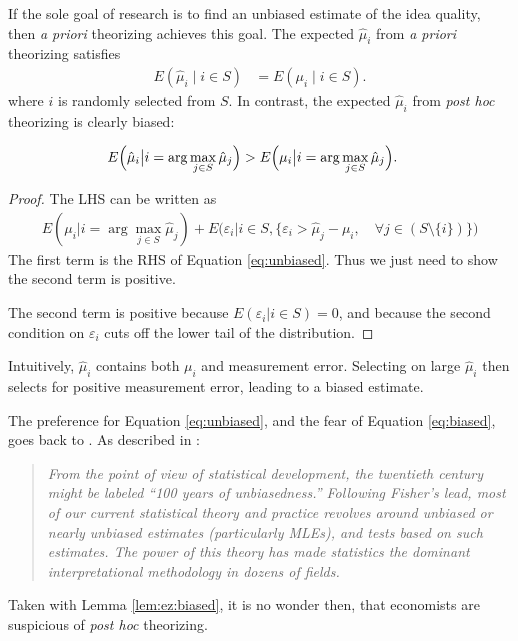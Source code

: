 \documentclass[12pt,english]{article}
\theoremstyle{plain}
\theoremstyle{plain}
\begin{document}
If the sole goal of research is to find an unbiased estimate of the idea quality, then \emph{a priori} theorizing achieves this goal.  The expected $\hat{\mu}_{i}$ from \emph{a priori} theorizing satisfies
\begin{align}
E\left(\hat{\mu}_{i}\mid i\in S \right) &= E\left(\mu_{i}\mid i\in S \right).
\label{eq:unbiased}
\end{align}
where $i$ is randomly selected from $S$. In contrast, the expected $\hat{\mu}_{i}$ from \emph{post hoc} theorizing is clearly biased:
\begin{lemma}\label{lem:ez:biased}
    \begin{align}
        E\Bigl(\hat{\mu}_{i}\big|i=\arg\max_{j\in S }\hat{\mu}_{j}\Bigr) & >E\Bigl(\mu_{i}\big|i=\arg\max_{j\in S }\hat{\mu}_{j}\Bigr).
        \label{eq:biased}
    \end{align}            
\end{lemma}
\begin{proof}
    The LHS can be written as 
    \begin{align*}
        E\left(\mu_i \big| i = \arg\max_{j \in S} \hat{\mu}_j\right) 
        +
        E\bigg(\varepsilon_i
        \big|
        i \in S,
        \{
         \varepsilon_i 
        > \hat{\mu}_j - \mu_i
        , \quad
         \forall j \in \left( S\setminus\{i\}
         \right)
         \}
         \bigg)
    \end{align*}
The first term is the RHS of Equation \eqref{eq:unbiased}. Thus we just need to show the second term is positive.

The second term is positive because $E\left(\varepsilon_i\big| i \in S\right) = 0$, and because the second condition on $\varepsilon_i$  cuts off the lower tail of the distribution.
\end{proof}


Intuitively, $\hat{\mu}_{i}$ contains both $\mu_{i}$ and measurement error. Selecting on large $\hat{\mu}_{i}$ then selects for positive measurement error, leading to a biased estimate.

The preference for Equation \eqref{eq:unbiased}, and the fear of Equation \eqref{eq:biased}, goes back to \citet{fisher1925statistical}. As described in \citet{efron2001statistical}:
\begin{quote}
    \emph{From the point of view of statistical development, the twentieth century might be labeled ``100 years of unbiasedness.'' Following Fisher's lead, most of our current statistical theory and practice revolves around unbiased or nearly unbiased estimates (particularly MLEs), and tests based on such estimates. The power of this theory has made statistics the dominant interpretational methodology in dozens of fields.}
\end{quote}
Taken with Lemma \ref{lem:ez:biased}, it is no wonder then, that economists are suspicious of \emph{post hoc} theorizing.
\end{document}
